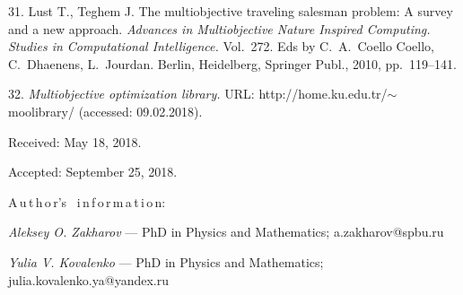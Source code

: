 {31. Lust T., Teghem J. The multiobjective traveling salesman
problem: A survey
  and a new approach.
  \textit{Advances in Multiobjective Nature Inspired
  Computing. Studies in Computational Intelligence.} Vol.~272.
  Eds by C.~A.~Coello Coello, C.~Dhaenens, L.~Jourdan.
  Berlin, Heidelberg, Springer Publ., 2010, pp.~119--141.

32. {\it Multiobjective optimization library.} URL:
http://home.ku.edu.tr/$\sim$moolibrary/ (accessed: 09.02.2018).

\vskip 1.5mm

%

Received:  May 18, 2018.

Accepted: September 25, 2018.

\vskip4.5mm%
A\,u\,t\,h\,o\,r's \ i\,n\,f\,o\,r\,m\,a\,t\,i\,o\,n:

\vskip1.5mm%
\textit{Aleksey O. Zakharov} --- PhD in Physics and
Mathematics; a.zakharov@spbu.ru

\vskip1.5mm%
\textit{Yulia V. Kovalenko} --- PhD in Physics and Mathematics;
julia.kovalenko.ya@yandex.ru\par
%
}

